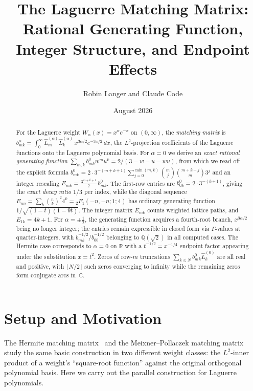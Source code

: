 \documentclass[11pt,a4paper]{article}
\title{\textbf{The Laguerre Matching Matrix:\\
Rational Generating Function, Integer Structure, and Endpoint Effects}}
\author{Robin Langer and Claude Code}
\date{August 2026}
\theoremstyle{definition}
\theoremstyle{plain}
\begin{document}
\maketitle

\begin{abstract}
For the Laguerre weight $W_\alpha(x) = x^\alpha e^{-x}$ on $(0,\infty)$, the
\emph{matching matrix} is
$b_{mk}^\alpha = \int_0^\infty \hat{L}_m^{(\alpha)}\hat{L}_k^{(\alpha)}\,
x^{3\alpha/2}e^{-3x/2}\,dx$,
the $L^2$-projection coefficients of the Laguerre functions onto the Laguerre
polynomial basis.
For $\alpha = 0$ we derive an \emph{exact rational generating function}
$\sum_{m,k}b_{mk}^0 w^m u^k = 2/(3-w-u-wu)$,
from which we read off the explicit formula
$b_{mk}^0 = 2\cdot 3^{-(m+k+1)}\sum_{j=0}^{\min(m,k)}\!\binom{m}{j}\binom{m+k-j}{m}3^j$
and an integer rescaling $E_{mk} = \tfrac{3^{m+k+1}}{2}\,b_{mk}^0$.
The first-row entries are $b_{0k}^0 = 2\cdot 3^{-(k+1)}$, giving the
\emph{exact decay ratio} $1/3$ per index, while the diagonal sequence
$E_{nn} = \sum_k\binom{n}{k}^2 4^k = {}_2F_1(-n,-n;1;4)$ has ordinary generating function
$1/\sqrt{(1-t)(1-9t)}$.
The integer matrix $E_{mk}$ counts weighted lattice paths, and $E_{1k} = 4k+1$.
For $\alpha = \pm\tfrac12$, the generating function acquires a fourth-root branch,
$x^{3\alpha/2}$ being no longer integer; the entries remain expressible
in closed form via $\Gamma$-values at quarter-integers, with $b_{mk}^{-1/2}/b_{00}^{-1/2}$
belonging to $\mathbb{Q}(\sqrt{2})$ in all computed cases.
The Hermite case corresponds to $\alpha = 0$ on $\mathbb{R}$ with a
$t^{-1/2} = x^{-1/4}$ endpoint factor appearing under the substitution $x = t^2$.
Zeros of row-$m$ truncations $\sum_{k\le N}b_{mk}^0\hat{L}_k^{(0)}$ are all
real and positive, with $\lfloor N/2\rfloor$ such zeros converging to infinity
while the remaining zeros form conjugate arcs in~$\mathbb{C}$.
\end{abstract}

\section{Setup and Motivation}

The Hermite matching matrix~\cite{hermite-matching} and the Meixner--Pollaczek
matching matrix~\cite{mp-matching} study the same basic construction in two
different weight classes: the $L^2$-inner product of a weight's ``square-root
function'' against the original orthogonal polynomial basis.
Here we carry out the parallel construction for Laguerre polynomials.
\end{document}
